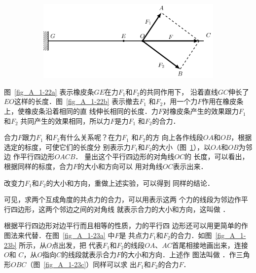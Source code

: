 \begin{figure}[htbp]
    \begin{subfigure} {1\linewidth} 
        \centering
        \includegraphics{fig/A/1-22c.pdf} 
        \caption{} \label{fig_A_1-22c} 
    \end{subfigure} 
    \caption{} \label{fig_A_1-22} 
\end{figure} 



    图~\ref{fig_A_1-22a} 表示橡皮条$GE$在力$F_1$和$F_2$的共同作用下，
沿着直线$GC$伸长了$EO$这样的长度．图~\ref{fig_A_1-22b} 表示撤去$F_1$
和$F_2$，用一个力$F$作用在橡皮条上，使橡皮条沿着相同的直
线伸长相同的长度．力$F$对橡皮条产生的效果跟力$F_1$
和$F_2$
共同产生的效果相同，所以力$F$是力$F_1$
和$F_2$的合力．




    合力$F$跟力$F_1$
和$F_2$有什么关系呢？在力$F_1$
和$F_2$的方
向上各作线段$OA$和$OB$，根据选定的标度，可使它们的长度分
别表示力$F_1$和$F_2$的大小（图~\ref{fig_A_1-22c}），以$OA$和$OB$为邻边
作平行四边形$OACB$．
量出这个平行四边形的对角线$OC$的
长度，可以看出，根据同样的标度，合力$F$的大小和方向可以
用对角线$OC$表示出来．

    改变力$F_1$和$F_2$的大小和方向，重做上述实验，可以得到
同样的结论．

    可见，求两个互成角度的共点力的合力，可以用表示这两
个力的线段为邻边作平行四边形，这两个邻边之间的对角线
就表示合力的大小和方向，这叫做 ．

    根据平行四边形对边平行而且相等的性质，力的平行四
边形还可以用更简单的作图法来代替．在图~\ref{fig_A_1-23a} 中$F$是
共点力$F_1$和$F_2$的合力．如图~\ref{fig_A_1-23b} 所示，从$O$点出发，把
代表$F_1$和$F_2$的线段$OA$、$AC$首尾相接地画出来，连接$O$和
$C$，从$O$指向$C$的线段就表示合力$F$的大小和方向．上述作
图法叫做 ．作三角形$OBC$（图~\ref{fig_A_1-23c}）同样可以求
出$F_1$和$F_2$的合力$F$．


